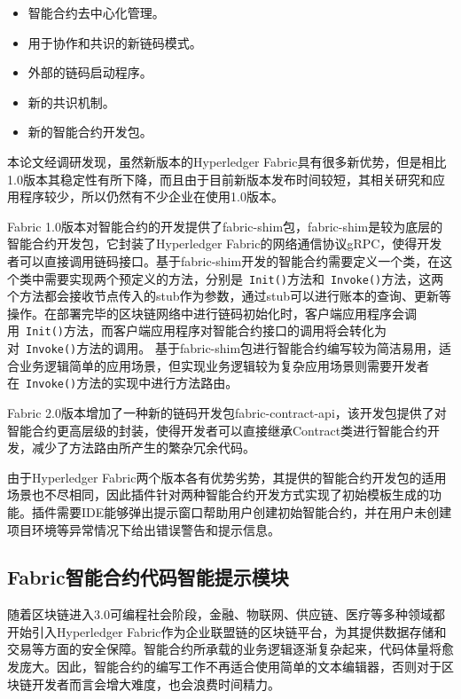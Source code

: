 \begin{itemize}
  \item 智能合约去中心化管理。
  \item 用于协作和共识的新链码模式。
  \item 外部的链码启动程序。
  \item 新的共识机制。
  \item 新的智能合约开发包。
\end{itemize}

本论文经调研发现，虽然新版本的Hyperledger Fabric具有很多新优势，但是相比1.0版本其稳定性有所下降，而且由于目前新版本发布时间较短，其相关研究和应用程序较少，所以仍然有不少企业在使用1.0版本。

Fabric 1.0版本对智能合约的开发提供了fabric-shim包，fabric-shim是较为底层的智能合约开发包，它封装了Hyperledger Fabric的网络通信协议gRPC，使得开发者可以直接调用链码接口。基于fabric-shim开发的智能合约需要定义一个类，在这个类中需要实现两个预定义的方法，分别是~\texttt{Init()}方法和~\texttt{Invoke()}方法，这两个方法都会接收节点传入的stub作为参数，通过stub可以进行账本的查询、更新等操作。在部署完毕的区块链网络中进行链码初始化时，客户端应用程序会调用~\texttt{Init()}方法，而客户端应用程序对智能合约接口的调用将会转化为对~\texttt{Invoke()}方法的调用。
基于fabric-shim包进行智能合约编写较为简洁易用，适合业务逻辑简单的应用场景，但实现业务逻辑较为复杂应用场景则需要开发者在~\texttt{Invoke()}方法的实现中进行方法路由。

Fabric 2.0版本增加了一种新的链码开发包fabric-contract-api，该开发包提供了对智能合约更高层级的封装，使得开发者可以直接继承Contract类进行智能合约开发，减少了方法路由所产生的繁杂冗余代码。

由于Hyperledger Fabric两个版本各有优势劣势，其提供的智能合约开发包的适用场景也不尽相同，因此插件针对两种智能合约开发方式实现了初始模板生成的功能。插件需要IDE能够弹出提示窗口帮助用户创建初始智能合约，并在用户未创建项目环境等异常情况下给出错误警告和提示信息。

\subsection{Fabric智能合约代码智能提示模块}

随着区块链进入3.0可编程社会阶段，金融、物联网、供应链、医疗等多种领域都开始引入Hyperledger Fabric作为企业联盟链的区块链平台，为其提供数据存储和交易等方面的安全保障。智能合约所承载的业务逻辑逐渐复杂起来，代码体量将愈发庞大。因此，智能合约的编写工作不再适合使用简单的文本编辑器，否则对于区块链开发者而言会增大难度，也会浪费时间精力。

